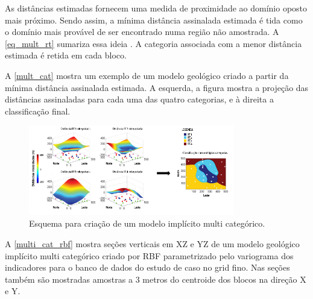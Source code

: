As distâncias estimadas fornecem uma medida de proximidade ao domínio oposto mais próximo. Sendo assim, a mínima distância assinalada estimada é tida como o domínio mais provável de ser encontrado numa região não amostrada. A \autoref{eq_mult_rt} sumariza essa ideia \cite{silvaenhancedgeomodeling}. A categoria associada com a menor distância estimada é retida em cada bloco.

A \autoref{mult_cat} mostra um exemplo de um modelo geológico criado a partir da mínima distância assinalada estimada. A esquerda, a figura mostra a projeção das distâncias assinaladas para cada uma das quatro categorias, e à direita a classificação final.

\begin{figure}[H]
    \caption{\label{mult_cat}Esquema para criação de um modelo implícito multi categórico.}
	\begin{center}
		\includegraphics[width=0.8\textwidth]{capitulo_2/mult_cat_legenda.jpg}
	\end{center}
\end{figure}

A \autoref{multi_cat_rbf} mostra seções verticais em XZ e YZ de um modelo geológico implícito multi categórico criado por RBF parametrizado pelo variograma dos indicadores para o banco de dados do estudo de caso no grid fino. Nas seções também são mostradas amostras a 3 metros do centroide dos blocos na direção X e Y.

